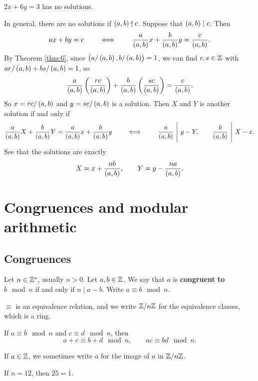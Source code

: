 \begin{example*}
$ 2x + 6y = 3 $ has no solutions.
\end{example*}

In general, there are no solutions if $ \br{a, b} \nmid c $. Suppose that $ \br{a, b} \mid c $. Then
$$ ax + by = c \qquad \iff \qquad \dfrac{a}{\br{a, b}}x + \dfrac{b}{\br{a, b}}y = \dfrac{c}{\br{a, b}}. $$
By Theorem \ref{thm:6}, since $ \br{a / \br{a, b}, b / \br{a, b}} = 1 $, we can find $ r, s \in \mathbb{Z} $ with $ ar / \br{a, b} + bs / \br{a, b} = 1 $, so
$$ \dfrac{a}{\br{a, b}}\br{\dfrac{rc}{\br{a, b}}} + \dfrac{b}{\br{a, b}}\br{\dfrac{sc}{\br{a, b}}} = \dfrac{c}{\br{a, b}}. $$
So $ x = rc / \br{a, b} $ and $ y = sc / \br{a, b} $ is a solution. Then $ X $ and $ Y $ is another solution if and only if
$$ \dfrac{a}{\br{a, b}}X + \dfrac{b}{\br{a, b}}Y = \dfrac{a}{\br{a, b}}x + \dfrac{b}{\br{a, b}}y \qquad \iff \qquad \dfrac{a}{\br{a, b}} \ \Bigg| \ y - Y, \qquad \dfrac{b}{\br{a, b}} \ \Bigg| \ X - x. $$
See that the solutions are exactly
$$ X = x + \dfrac{nb}{\br{a, b}}, \qquad Y = y - \dfrac{na}{\br{a, b}}. $$

\pagebreak

\section{Congruences and modular arithmetic}

\subsection{Congruences}

\begin{definition}
Let $ n \in \mathbb{Z}^* $, usually $ n > 0 $. Let $ a, b \in \mathbb{Z} $. We say that $ a $ is \textbf{congruent to $ b \mod n $} if and only if $ n \mid a - b $. Write $ a \equiv b \mod n $.
\end{definition}

$ \equiv $ is an equivalence relation, and we write $ \mathbb{Z} / n\mathbb{Z} $ for the equivalence classes, which is a ring.

\begin{example*}
If $ a \equiv b \mod n $ and $ c \equiv d \mod n $, then
$$ a + c \equiv b + d \mod n, \qquad ac \equiv bd \mod n. $$
\end{example*}

If $ a \in \mathbb{Z} $, we sometimes write $ \overline{a} $ for the image of $ a $ in $ \mathbb{Z} / n\mathbb{Z} $.

\begin{example*}
If $ n = 12 $, then $ \overline{25} = \overline{1} $.
\end{example*}

